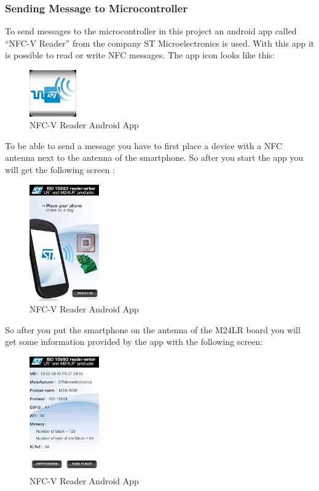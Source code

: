 \documentclass[11pt]{article}
\begin{document}
\subsubsection{Sending Message to Microcontroller}
To send messages to the microcontroller in this project an android app called "`NFC-V Reader"' from the company ST Microelectronics is used. With this app it is possible to read or write NFC messages. The app icon looks like this:

\begin{figure}[H]
 \centering
 \includegraphics [width=2cm]{nfcvreader.jpg} 
 \caption{NFC-V Reader Android App\cite{cite10}}
\end{figure}

To be able to send a message you have to first place a device with a NFC antenna next to the antenna of the smartphone. So after you start the app you will get the following screen :

\begin{figure}[H]
 \centering
 \includegraphics [width=3cm]{NFCvreader_place.jpg} 
 \caption{NFC-V Reader Android App\cite{cite10}}
\end{figure}

So after you put the smartphone on the antenna of the M24LR board you will get some information provided by the app with the following screen:

\begin{figure}[H]
 \centering
 \includegraphics [width=3cm]{NFCvreader_screen2.jpg} 
 \caption{NFC-V Reader Android App\cite{cite10}}
\end{figure}
\end{document}
